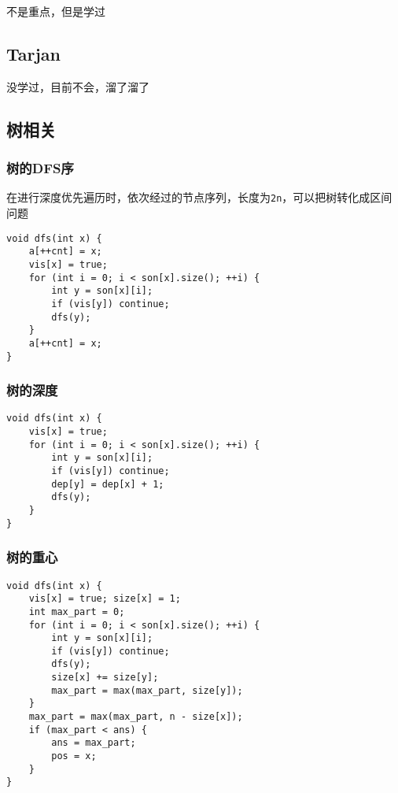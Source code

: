 \documentclass[UTF8]{ctexart}
\begin{document}
不是重点，但是学过

\subsection{Tarjan}

没学过，目前不会，溜了溜了

\subsection{树相关}

\subsubsection{树的DFS序}

在进行深度优先遍历时，依次经过的节点序列，长度为\texttt{2n}，可以把树转化成区间问题

\begin{lstlisting}
void dfs(int x) {
    a[++cnt] = x;
    vis[x] = true;
    for (int i = 0; i < son[x].size(); ++i) {
        int y = son[x][i];
        if (vis[y]) continue;
        dfs(y);
    }
    a[++cnt] = x;
}
\end{lstlisting}

\subsubsection{树的深度}

\begin{lstlisting}
void dfs(int x) {
    vis[x] = true;
    for (int i = 0; i < son[x].size(); ++i) {
        int y = son[x][i];
        if (vis[y]) continue;
        dep[y] = dep[x] + 1;
        dfs(y);
    }
}
\end{lstlisting}

\subsubsection{树的重心}

\begin{lstlisting}
void dfs(int x) {
    vis[x] = true; size[x] = 1;
    int max_part = 0;
    for (int i = 0; i < son[x].size(); ++i) {
        int y = son[x][i];
        if (vis[y]) continue;
        dfs(y);
        size[x] += size[y];
        max_part = max(max_part, size[y]);
    }
    max_part = max(max_part, n - size[x]);
    if (max_part < ans) {
        ans = max_part; 
        pos = x;
    }
}
\end{lstlisting}
\end{document}
